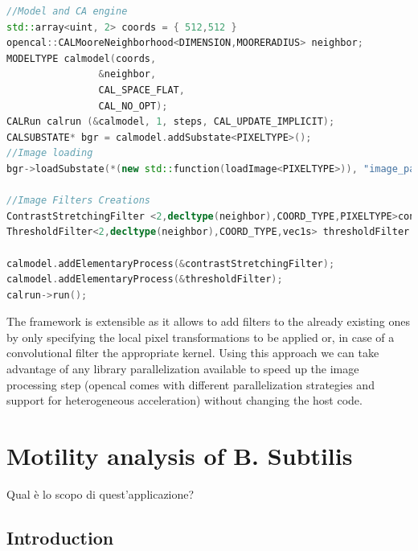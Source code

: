 \documentclass[conference]{IEEEtran}
\begin{document}
\begin{framed}
\begin{lstlisting}[language=C++,caption=Example of usage of the Image processing XCA engine. A model and a CA runtime are created. The raw image is then read into the substate. Elementary processes corrensponding to the operations to be performed on the image are set and the runtime is launched. ,label=list:imgman]	
//Model and CA engine
std::array<uint, 2> coords = { 512,512 }
opencal::CALMooreNeighborhood<DIMENSION,MOORERADIUS> neighbor;
MODELTYPE calmodel(coords,
                &neighbor,
                CAL_SPACE_FLAT,
                CAL_NO_OPT);
CALRun calrun (&calmodel, 1, steps, CAL_UPDATE_IMPLICIT); 
CALSUBSTATE* bgr = calmodel.addSubstate<PIXELTYPE>();
//Image loading
bgr->loadSubstate(*(new std::function(loadImage<PIXELTYPE>)), "image_path");

//Image Filters Creations
ContrastStretchingFilter <2,decltype(neighbor),COORD_TYPE,PIXELTYPE>contrastStretchingFilter(bgr, 1285, 1542, 0, 65535,1.0);
ThresholdFilter<2,decltype(neighbor),COORD_TYPE,vec1s> thresholdFilter (bgr,0,61680,0,65535);

calmodel.addElementaryProcess(&contrastStretchingFilter);
calmodel.addElementaryProcess(&thresholdFilter);
calrun->run();
\end{lstlisting}
\end{framed}
The framework is extensible as it allows to add filters to the already existing ones by only specifying the local pixel transformations to be applied or, in case of a convolutional filter the appropriate kernel.
Using this approach we can take advantage of any library parallelization available to speed up the image processing step (opencal comes with different parallelization strategies and support for heterogeneous acceleration) without changing the host code.



\section{Motility analysis of B. Subtilis}
\label{sect:bacteriaanalysis}
Qual è lo scopo di quest'applicazione?
\subsection{Introduction}
\end{document}
